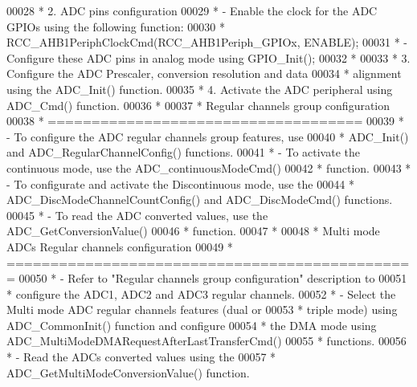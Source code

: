 \begin{DoxyCode}
00028 \textcolor{comment}{  *          2. ADC pins configuration}
00029 \textcolor{comment}{  *               - Enable the clock for the ADC GPIOs using the following function:}
00030 \textcolor{comment}{  *                   RCC\_AHB1PeriphClockCmd(RCC\_AHB1Periph\_GPIOx, ENABLE);   }
00031 \textcolor{comment}{  *                - Configure these ADC pins in analog mode using GPIO\_Init();  }
00032 \textcolor{comment}{  *}
00033 \textcolor{comment}{  *          3. Configure the ADC Prescaler, conversion resolution and data }
00034 \textcolor{comment}{  *              alignment using the ADC\_Init() function.}
00035 \textcolor{comment}{  *          4. Activate the ADC peripheral using ADC\_Cmd() function.}
00036 \textcolor{comment}{  *}
00037 \textcolor{comment}{  *          Regular channels group configuration}
00038 \textcolor{comment}{  *          ====================================    }
00039 \textcolor{comment}{  *            - To configure the ADC regular channels group features, use }
00040 \textcolor{comment}{  *              ADC\_Init() and ADC\_RegularChannelConfig() functions.}
00041 \textcolor{comment}{  *            - To activate the continuous mode, use the ADC\_continuousModeCmd()}
00042 \textcolor{comment}{  *              function.}
00043 \textcolor{comment}{  *            - To configurate and activate the Discontinuous mode, use the }
00044 \textcolor{comment}{  *              ADC\_DiscModeChannelCountConfig() and ADC\_DiscModeCmd() functions.}
00045 \textcolor{comment}{  *            - To read the ADC converted values, use the ADC\_GetConversionValue()}
00046 \textcolor{comment}{  *              function.}
00047 \textcolor{comment}{  *}
00048 \textcolor{comment}{  *          Multi mode ADCs Regular channels configuration}
00049 \textcolor{comment}{  *          ===============================================}
00050 \textcolor{comment}{  *            - Refer to "Regular channels group configuration" description to}
00051 \textcolor{comment}{  *              configure the ADC1, ADC2 and ADC3 regular channels.        }
00052 \textcolor{comment}{  *            - Select the Multi mode ADC regular channels features (dual or }
00053 \textcolor{comment}{  *              triple mode) using ADC\_CommonInit() function and configure }
00054 \textcolor{comment}{  *              the DMA mode using ADC\_MultiModeDMARequestAfterLastTransferCmd() }
00055 \textcolor{comment}{  *              functions.        }
00056 \textcolor{comment}{  *            - Read the ADCs converted values using the }
00057 \textcolor{comment}{  *              ADC\_GetMultiModeConversionValue() function.}

\end{DoxyCode}
